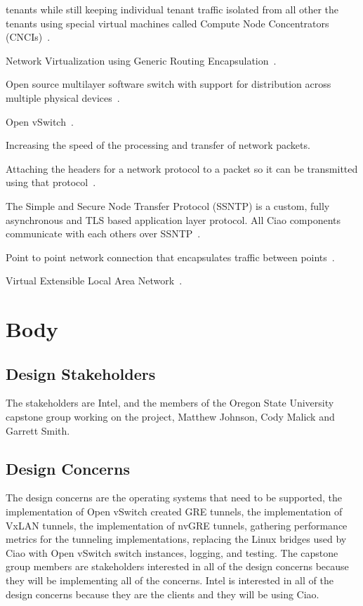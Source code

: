 \documentclass[10pt,onecolumn,journal,draftclsnofoot]{IEEEtran}
\begin{document}
\begin{description}[leftmargin=12em,style=nextline]
		tenants while still keeping individual tenant traffic isolated
		from all other the tenants using special virtual machines called
		Compute Node Concentrators (CNCIs)~\cite{ciaoNetworking}.
	\item[nvGRE]
		Network Virtualization using Generic Routing
		Encapsulation~\cite{rfc7637}.
	\item[Open vSwitch]
		Open source multilayer software switch with support for
		distribution across multiple physical devices~\cite{ovs}.
	\item[OVS]
		Open vSwitch~\cite{ovs}.
	\item[Packet Acceleration]
		Increasing the speed of the processing and transfer of network
		packets.
	\item[Packet Encapsulation]
		Attaching the headers for a network protocol to a packet so it
		can be transmitted using that
		protocol~\cite{networkingTextbook}.
	\item[SSNTP]
		The Simple and Secure Node Transfer Protocol (SSNTP) is a
		custom, fully asynchronous and TLS based application layer
		protocol. All Ciao components communicate with each others over
		SSNTP~\cite{ciaoSSNTP}.
	\item[Tunnel]
		Point to point network connection that encapsulates traffic
		between points~\cite{networkingTextbook}.
	\item[VxLAN]
		Virtual Extensible Local Area Network~\cite{rfc7348}.
\end{description}

\section{Body}
\subsection{Design Stakeholders}
The stakeholders are Intel, and the members of the Oregon State University 
capstone group working on the project, Matthew Johnson, Cody Malick and Garrett 
Smith.
\subsection{Design Concerns}
The design concerns are the operating systems that need to be supported, 
the implementation of Open vSwitch created GRE tunnels, 
the implementation of VxLAN tunnels, the implementation of nvGRE tunnels, 
gathering performance metrics for the tunneling implementations, replacing 
the Linux bridges used by Ciao with Open vSwitch switch instances, logging, and 
testing. The capstone group members are stakeholders interested in all of the 
design concerns because they will be implementing all of the concerns. Intel is
interested in all of the design concerns because they are the clients and they
will be using Ciao.
\end{document}
